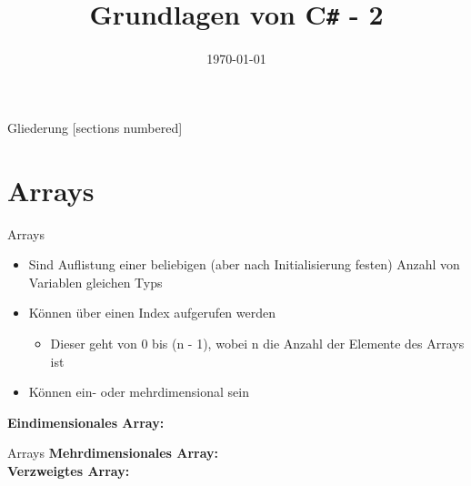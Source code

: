 



\title{Grundlagen von C\texttt{\#} - 2}
\date{\today}




\maketitle

\begin{frame}{Gliederung}
	[sections numbered]
	\tableofcontents
\end{frame}

\section{Arrays}
\begin{frame}{Arrays}
	\begin{itemize}
		\item Sind Auflistung einer beliebigen (aber nach Initialisierung festen) Anzahl von Variablen gleichen Typs
		\item Können über einen Index aufgerufen werden
		\begin{itemize}
			\item Dieser geht von 0 bis (n - 1), wobei n die Anzahl der Elemente des Arrays ist
		\end{itemize}
		\item Können ein- oder mehrdimensional sein
	\end{itemize}
	\textbf{Eindimensionales Array:}\\
		
\end{frame}

\begin{frame}{Arrays}
	\textbf{Mehrdimensionales Array:}\\
		
	\textbf{Verzweigtes Array:}\\
	
\end{frame}

